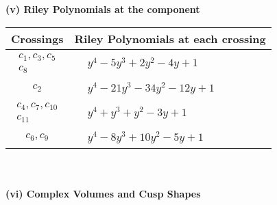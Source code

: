 \documentclass[1p]{elsarticle_modified}
\theoremstyle{definition}
\begin{document}
\newpage\renewcommand{\arraystretch}{1}
\flushleft \textbf{(v) Riley Polynomials at the component}\newline \\
\begin{tabular}{m{50pt}|m{274pt}}
Crossings & \hspace{64pt}Riley Polynomials at each crossing \\
\hline $$\begin{aligned}c_{1},c_{3},c_{5}\\c_{8}\end{aligned}$$&$\begin{aligned}
&y^4-5 y^3+2 y^2-4 y+1
\end{aligned}$\\
\hline $$\begin{aligned}c_{2}\end{aligned}$$&$\begin{aligned}
&y^4-21 y^3-34 y^2-12 y+1
\end{aligned}$\\
\hline $$\begin{aligned}c_{4},c_{7},c_{10}\\c_{11}\end{aligned}$$&$\begin{aligned}
&y^4+y^3+y^2-3 y+1
\end{aligned}$\\
\hline $$\begin{aligned}c_{6},c_{9}\end{aligned}$$&$\begin{aligned}
&y^4-8 y^3+10 y^2-5 y+1
\end{aligned}$\\
\hline
\end{tabular}\\~\\
\newpage\flushleft \textbf{(vi) Complex Volumes and Cusp Shapes}
\end{document}
